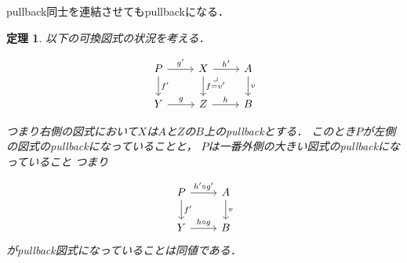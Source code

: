 \documentclass[leqno, a4paper, 12pt, dvipdfmx]{jsarticle}
\newtheorem{thm}{定理}
\begin{document}
pullback同士を連結させてもpullbackになる．
\begin{thm}\label{thm:yoko}
以下の可換図式の状況を考える．



\[
\begin{tikzcd}
P \arrow[r, "g^{\prime}"] \arrow[d, "f^{\prime}"] & X \arrow[d,"f=v^{\prime}"]  \arrow[r, "h^{\prime}"]\arrow[dr, phantom, "\lrcorner", very near start] & A \arrow[d, "v"]\\
Y \arrow[r,"g"] & Z \arrow[r, "h"]& B
\end{tikzcd}
\]

つまり右側の図式において$X$は$A$と$Z$の$B$上のpullbackとする．
このとき$P$が左側の図式のpullbackになっていることと，
$P$は一番外側の大きい図式のpullbackになっていること
つまり


\[
\begin{tikzcd}
P \arrow[r, "h^{\prime}\circ g^{\prime}"] \arrow[d, "f^{\prime}"]& A \arrow[d,"v"] \\
Y \arrow[r,"h\circ g"] & B
\end{tikzcd}
\]
がpullback図式になっていることは同値である．
\end{thm}
\end{document}
